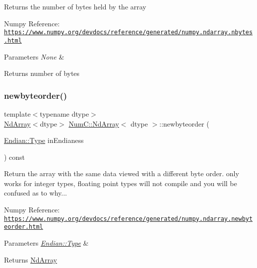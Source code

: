 Returns the number of bytes held by the array

Numpy Reference\+: \href{https://www.numpy.org/devdocs/reference/generated/numpy.ndarray.nbytes.html}{\tt https\+://www.\+numpy.\+org/devdocs/reference/generated/numpy.\+ndarray.\+nbytes.\+html}


\begin{DoxyParams}{Parameters}
{\em None} & \\
\hline
\end{DoxyParams}
\begin{DoxyReturn}{Returns}
number of bytes 
\end{DoxyReturn}
\mbox{\label{class_num_c_1_1_nd_array_a992b403fa64d2d3c4516b0ca9328de66}} 
\subsubsection{\texorpdfstring{newbyteorder()}{newbyteorder()}}
{\footnotesize\ttfamily template$<$typename dtype$>$ \\
\mbox{\hyperlink{class_num_c_1_1_nd_array}{Nd\+Array}}$<$dtype$>$ \mbox{\hyperlink{class_num_c_1_1_nd_array}{Num\+C\+::\+Nd\+Array}}$<$ dtype $>$\+::newbyteorder (\begin{DoxyParamCaption}\item[{\mbox{\hyperlink{struct_num_c_1_1_endian_ab667001489f67f8a96f328f0a9c351fa}{Endian\+::\+Type}}}]{in\+Endianess }\end{DoxyParamCaption}) const\hspace{0.3cm}{\ttfamily [inline]}}

Return the array with the same data viewed with a different byte order. only works for integer types, floating point types will not compile and you will be confused as to why...

Numpy Reference\+: \href{https://www.numpy.org/devdocs/reference/generated/numpy.ndarray.newbyteorder.html}{\tt https\+://www.\+numpy.\+org/devdocs/reference/generated/numpy.\+ndarray.\+newbyteorder.\+html}


\begin{DoxyParams}{Parameters}
{\em \mbox{\hyperlink{struct_num_c_1_1_endian_ab667001489f67f8a96f328f0a9c351fa}{Endian\+::\+Type}}} & \\
\hline
\end{DoxyParams}
\begin{DoxyReturn}{Returns}
\mbox{\hyperlink{class_num_c_1_1_nd_array}{Nd\+Array}} 
\end{DoxyReturn}
\mbox{\label{class_num_c_1_1_nd_array_aa0a3b09f956b37105f51728f43fedc75}} 
